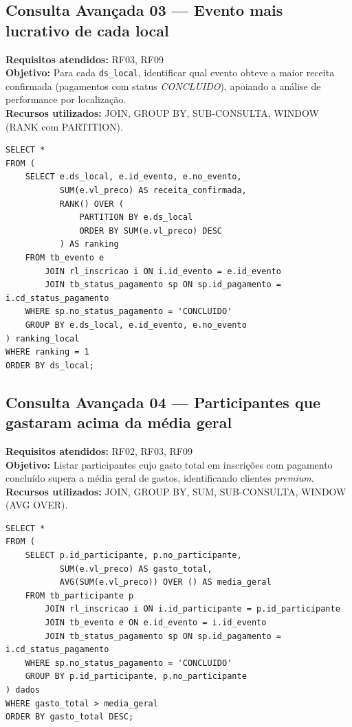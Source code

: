 \documentclass[12pt,a4paper]{article}
\begin{document}
\subsection{Consulta Avançada 03 --- Evento mais lucrativo de cada local}
\textbf{Requisitos atendidos:} RF03, RF09 \\
\textbf{Objetivo:} Para cada \texttt{ds\_local}, identificar qual evento obteve a maior receita confirmada (pagamentos com status \textit{CONCLUIDO}), apoiando a análise de performance por localização. \\
\textbf{Recursos utilizados:} JOIN, GROUP BY, SUB-CONSULTA, WINDOW (RANK com PARTITION).
\begin{lstlisting}[caption={QA03 --- Evento mais lucrativo de cada local.}]
SELECT *
FROM (
    SELECT e.ds_local, e.id_evento, e.no_evento,
           SUM(e.vl_preco) AS receita_confirmada,
           RANK() OVER (
               PARTITION BY e.ds_local
               ORDER BY SUM(e.vl_preco) DESC
           ) AS ranking
    FROM tb_evento e
        JOIN rl_inscricao i ON i.id_evento = e.id_evento
        JOIN tb_status_pagamento sp ON sp.id_pagamento = i.cd_status_pagamento
    WHERE sp.no_status_pagamento = 'CONCLUIDO'
    GROUP BY e.ds_local, e.id_evento, e.no_evento
) ranking_local
WHERE ranking = 1
ORDER BY ds_local;
\end{lstlisting}

\subsection{Consulta Avançada 04 --- Participantes que gastaram acima da média geral}
\textbf{Requisitos atendidos:} RF02, RF03, RF09 \\
\textbf{Objetivo:} Listar participantes cujo gasto total em inscrições com pagamento concluído supera a média geral de gastos, identificando clientes \emph{premium}. \\
\textbf{Recursos utilizados:} JOIN, GROUP BY, SUM, SUB-CONSULTA, WINDOW (AVG OVER).
\begin{lstlisting}[caption={QA04 --- Participantes que gastaram acima da média geral.}]
SELECT *
FROM (
    SELECT p.id_participante, p.no_participante,
           SUM(e.vl_preco) AS gasto_total,
           AVG(SUM(e.vl_preco)) OVER () AS media_geral
    FROM tb_participante p
        JOIN rl_inscricao i ON i.id_participante = p.id_participante
        JOIN tb_evento e ON e.id_evento = i.id_evento
        JOIN tb_status_pagamento sp ON sp.id_pagamento = i.cd_status_pagamento
    WHERE sp.no_status_pagamento = 'CONCLUIDO'
    GROUP BY p.id_participante, p.no_participante
) dados
WHERE gasto_total > media_geral
ORDER BY gasto_total DESC;
\end{lstlisting}
\end{document}
